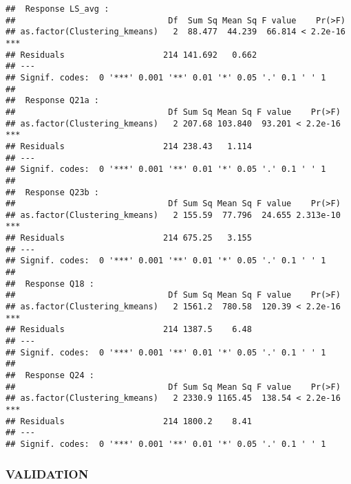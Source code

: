 \documentclass[
]{article}
\begin{document}
\begin{verbatim}
##  Response LS_avg :
##                               Df  Sum Sq Mean Sq F value    Pr(>F)    
## as.factor(Clustering_kmeans)   2  88.477  44.239  66.814 < 2.2e-16 ***
## Residuals                    214 141.692   0.662                      
## ---
## Signif. codes:  0 '***' 0.001 '**' 0.01 '*' 0.05 '.' 0.1 ' ' 1
## 
##  Response Q21a :
##                               Df Sum Sq Mean Sq F value    Pr(>F)    
## as.factor(Clustering_kmeans)   2 207.68 103.840  93.201 < 2.2e-16 ***
## Residuals                    214 238.43   1.114                      
## ---
## Signif. codes:  0 '***' 0.001 '**' 0.01 '*' 0.05 '.' 0.1 ' ' 1
## 
##  Response Q23b :
##                               Df Sum Sq Mean Sq F value    Pr(>F)    
## as.factor(Clustering_kmeans)   2 155.59  77.796  24.655 2.313e-10 ***
## Residuals                    214 675.25   3.155                      
## ---
## Signif. codes:  0 '***' 0.001 '**' 0.01 '*' 0.05 '.' 0.1 ' ' 1
## 
##  Response Q18 :
##                               Df Sum Sq Mean Sq F value    Pr(>F)    
## as.factor(Clustering_kmeans)   2 1561.2  780.58  120.39 < 2.2e-16 ***
## Residuals                    214 1387.5    6.48                      
## ---
## Signif. codes:  0 '***' 0.001 '**' 0.01 '*' 0.05 '.' 0.1 ' ' 1
## 
##  Response Q24 :
##                               Df Sum Sq Mean Sq F value    Pr(>F)    
## as.factor(Clustering_kmeans)   2 2330.9 1165.45  138.54 < 2.2e-16 ***
## Residuals                    214 1800.2    8.41                      
## ---
## Signif. codes:  0 '***' 0.001 '**' 0.01 '*' 0.05 '.' 0.1 ' ' 1
\end{verbatim}

\hypertarget{validation}{%
\subsubsection{VALIDATION}\label{validation}}
\end{document}
